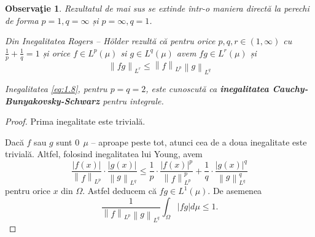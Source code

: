 \documentclass[a4paper,12pt,oneside]{report}
\newtheorem{remark}{Observa\c{t}ie}
\begin{document}
\begin{remark}
	Rezultatul de mai sus se extinde într-o maniera directă la perechi de forma \(p = 1, q = \infty\) și \(p = \infty, q = 1\).
	
Din Inegalitatea Rogers – Hölder rezultă că pentru orice \(p, q, r \in \left ( 1 , \infty  \right )\) cu \(\frac{1}{p} + \frac{1}{q} = 1\) și orice \(f\in L^{p}\left ( \mu  \right )\) si \(g\in L^{q}\left ( \mu  \right )\) avem \(fg\in L^{r}\left ( \mu  \right )\) și
\begin{displaymath}
  \left \| fg \right \|_{L^{r}}\leq \left \| f \right \|_{L^{p}}\left \| g \right \|_{L^{q}} \label{eq:1.9} \tag{1.9}
\end{displaymath}


Inegalitatea \ref{eq:1.8}, pentru \(p = q = 2\), este cunoscută ca \textbf{inegalitatea Cauchy-Bunyakovsky-Schwarz} pentru integrale.
\end{remark}
\begin{proof}
Prima inegalitate este trivială.

Dacă \(f\) sau \(g\) sunt \(0~~ \mu\) – aproape peste tot, atunci cea de a doua inegalitate este trivială. Altfel, folosind inegalitatea lui Young, avem
\begin{displaymath}
  \frac{\left | f\left ( x \right ) \right |}{\left \| f \right \|_{L^{p}}} \cdot \frac{\left | g\left ( x \right ) \right |}{\left \| g \right \|_{L^{q}}}\leq \frac{1}{p}\cdot \frac{\left | f\left ( x \right ) \right |^{p}}{\left \| f \right \|^{p}_{L^{p}}} + \frac{1}{q}\cdot \frac{\left | g\left ( x \right ) \right |^{q}}{\left \| g \right \|^{q}_{L^{q}}}
\end{displaymath}
 pentru orice \(x\) din \(\Omega\). Astfel deducem că \(fg \in L^{1}\left ( \mu  \right )\). De asemenea
\begin{displaymath}
  \frac{1}{\left \| f \right \|_{L^{p}}\left \| g \right \|_{L^{q}}}\int_{\Omega }\left | fg \right |d\mu \leq 1.
\end{displaymath}
\end{proof}
\end{document}
